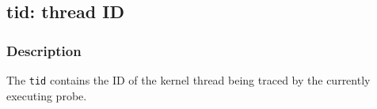 \clearpage
{}
{}
\label{vars:tid}
\subsection*{tid: thread ID}

\subsubsection*{Description}

The \verb|tid| contains the ID of the kernel thread being traced by
the currently executing probe.

